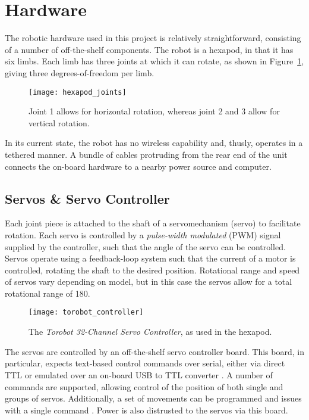 
\section{Hardware}

The robotic hardware used in this project is relatively straightforward, consisting of a number of off-the-shelf components. The robot is a hexapod, in that it has six limbs. Each limb has three joints at which it can rotate, as shown in Figure~\ref{fig:hexapod_dof}, giving three degrees-of-freedom per limb. 

\begin{figure}[!h]
    \centering
    \texttt{[image: hexapod\_joints]}
    \caption{Joint 1 allows for horizontal rotation, whereas joint 2 and 3 allow for vertical rotation.}
    \label{fig:hexapod_dof}
\end{figure}

In its current state, the robot has no wireless capability and, thusly, operates in a tethered manner. A bundle of cables protruding from the rear end of the unit connects the on-board hardware to a nearby power source and computer.

\subsection{Servos \& Servo Controller}
Each joint piece is attached to the shaft of a servomechanism (servo) to facilitate rotation. Each servo is controlled by a \emph{pulse-width modulated} (PWM) signal supplied by the controller, such that the angle of the servo can be controlled. Servos operate using a feedback-loop system such that the current of a motor is controlled, rotating the shaft to the desired position. Rotational range and speed of servos vary depending on model, but in this case the servos allow for a total rotational range of 180\textdegree.

\begin{figure}[!h]
    \centering
    \texttt{[image: torobot\_controller]}
    \caption{The \emph{Torobot 32-Channel Servo Controller}, as used in the hexapod.}
    \label{fig:torobot_controller}
\end{figure}

The servos are controlled by an off-the-shelf servo controller board. This board, in particular, expects text-based control commands over serial, either via direct TTL or emulated over an on-board USB to TTL converter \cite{torobot_manual}. A number of commands are supported, allowing control of the position of both single and groups of servos. Additionally, a set of movements can be programmed and issues with a single command \cite{torobot_manual}. Power is also distrusted to the servos via this board.

